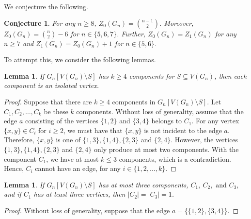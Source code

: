 \documentclass[3p,times,12pt]{article}
\newtheorem{lemma}[theorem]{Lemma}
\newtheorem{conj}[theorem]{Conjecture}
\begin{document}
	We conjecture the following.
	\begin{conj}
		For any $n\geq 8$, $Z_0(G_n) = \binom{n-1}{2}$. Moreover, $Z_0(G_n) = \binom{n}{2}-6$ for $n\in \{5,6,7\}$. Further, $Z_0(G_n) = Z_1(G_n)$ for any $n\geq 7$ and $Z_1(G_n) = Z_0(G_n) +1$ for $n\in \{5,6\}$.
	\end{conj}
	
	To attempt this, we consider the following lemmas. 
	\begin{lemma}
		If $G_n[V(G_n) \setminus S]$ has $k\geq 4$ components for $S \subseteq V(G_n)$, then each component is an isolated vertex.\label{lem:kneser1}
	\end{lemma}
	\begin{proof}
		Suppose that there are $k\geq 4$ components in $G_n[V(G_n) \setminus S]$. Let $C_1,C_2,\ldots,C_k$ be these $k$ components. Without loss of generality, assume that the edge $a$ consisting of the vertices $\{1,2\}$ and $\{3,4\}$ belongs to $C_1$. For any vertex $\{x,y\} \in C_i$ for  $i\geq 2$, we must have that $ \{x,y\}$ is not incident to the edge $a$. Therefore, $\{x,y\}$ is one of $\{1,3\}, \{1,4\}, \{2,3\}$ and $\{2,4\}$. However, the vertices $\{1,3\}, \{1,4\}, \{2,3\}$ and $\{2,4\}$ only produce at most two components. With the component $C_1$, we have at most $k\leq 3$ components, which is a contradiction. Hence, $C_i$ cannot have an edge, for any $i\in \{1,2,\ldots,k\}$.
	\end{proof}

	\begin{lemma}
		If $G_n[V(G_n) \setminus S]$ has at most three components, $C_1,\ C_2, \mbox{ and }C_3$, and if $C_1$ has at least three vertices, then $|C_2| = |C_3| = 1$.\label{lem:kneser2}
	\end{lemma}
	\begin{proof}
		Without loss of generality, suppose that the edge $a = \{ \{1,2\},\{3,4\} \}$.
	\end{proof}
\end{document}
